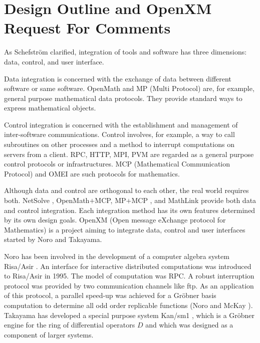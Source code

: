 
\section{Design Outline and OpenXM Request For Comments} 

As Schefstr\"om\cite{schefstrom} clarified,
integration of tools and software has three dimensions:
data, control, and user interface.

Data integration is concerned with the exchange of data between different
software or same software.
OpenMath \cite{OpenMath} and MP (Multi Protocol) \cite{GKW} are,
for example, general purpose mathematical data protocols.
They provide standard ways to express mathematical objects.

Control integration is concerned with the establishment and management of
inter-software communications.
Control involves, for example, a way to call subroutines on other processes
and a method to interrupt computations on servers from a client.
RPC, HTTP, MPI, PVM are regarded as a general purpose control protocols or
infrastructures.
MCP (Mathematical Communication Protocol)\cite{iamc}
and OMEI \cite{omei} are such protocols for mathematics.

Although data and control are orthogonal to each other,
the real world requires both.
NetSolve \cite{netsolve}, OpenMath$+$MCP, MP$+$MCP \cite{iamc},
and MathLink \cite{mathlink} provide both data and control integration.
Each integration method has its own features determined by its
own design goals.
OpenXM (Open message eXchange protocol for Mathematics)
is a project aiming to integrate data, control and user interfaces
started by Noro and Takayama.

Noro has been involved in the development of 
a computer algebra system Risa/Asir \cite{asir}.
An interface for interactive distributed computations was introduced
to Risa/Asir in 1995.
The model of computation was RPC.
A robust interruption protocol was provided 
by  two communication channels like ftp.
As an application of this protocol,
a parallel speed-up was achieved for a Gr\"obner basis computation
to determine all odd order replicable functions 
(Noro and McKay \cite{noro-mckay}).
Takayama has developed
a special purpose system Kan/sm1 \cite{kan},
which is a Gr\"obner engine for the ring of differential operators $D$
and which was designed as a component of larger systems. 

